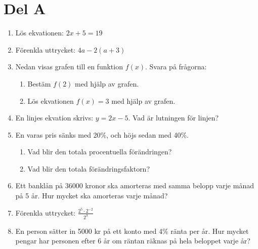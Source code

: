 \documentclass[a4paper,11pt]{article}
\begin{document}
\section*{Del A}
\begin{enumerate}[label=\textbf{\arabic*.}]
    \item Lös ekvationen: $2x + 5 = 19$
    \item Förenkla uttrycket: $4a - 2(a + 3)$
    \item Nedan visas grafen till en funktion $f(x)$. Svara på frågorna:
    \begin{enumerate}[label=\alph*)]
        \item Bestäm $f(2)$ med hjälp av grafen.
        \item Lös ekvationen $f(x) = 3$ med hjälp av grafen.
    \end{enumerate}
    \begin{center}
    \end{center}
    \item En linjes ekvation skrivs: $y = 2x - 5$. Vad är lutningen för linjen?
    \item En varas pris sänks med 20\%, och höjs sedan med 40\%. 
    \begin{enumerate}[label=\alph*)]
      \item Vad blir den totala procentuella förändringen?
      \item Vad blir den totala förändringsfaktorn?
    \end{enumerate}
    \item Ett banklån på 36000 kronor ska amorteras med samma belopp varje månad på 5 år. Hur mycket ska amorteras varje månad?
    \item Förenkla uttrycket: $\displaystyle \frac{2^5 \cdot 2^{-2}}{2^3}$
    \item En person sätter in 5000 kr på ett konto med 4\% ränta per år. Hur mycket pengar har personen efter 6 år om räntan räknas på hela beloppet varje år?
  

\end{enumerate}
\end{document}
